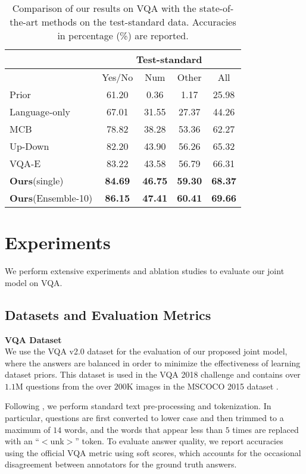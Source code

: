 \documentclass[11pt,a4paper]{article}
\begin{document}
\begin{table*}[!t]
\centering
\begin{tabular}{l|ccc|c}
\hline \toprule
                   & \multicolumn{4}{c}{Test-standard} \\\hline
                       & Yes/No  & Num   & Other  &All\\ \hline\hline
Prior \cite{goyal2017making} &61.20 & 0.36 &1.17 & 25.98 \\
Language-only \cite{goyal2017making} & 67.01 &31.55 & 27.37 & 44.26\\
MCB \cite{fukui2016multimodal} & 78.82 & 38.28 & 53.36 & 62.27 \\
Up-Down \cite{anderson2017bottom}   & 82.20    & 43.90  & 56.26 & 65.32   \\
VQA-E \cite{li2018vqa}   & 83.22 & 43.58 & 56.79 & 66.31   \\
\textbf{Ours}(single) & \textbf{84.69}   &  \textbf{46.75}  &    \textbf{59.30}     & \textbf{68.37}    \\\hline
\textbf{Ours}(Ensemble-10)  &\textbf{86.15}   &  \textbf{47.41} &  \textbf{60.41}   & \textbf{69.66}    \\\bottomrule
\end{tabular}
\caption{Comparison of our results on VQA with the state-of-the-art methods on the test-standard data. Accuracies in percentage (\%) are reported.}
\label{tab:vqa_compare}
\end{table*}
\section{Experiments}
We perform extensive experiments and ablation studies to evaluate our joint model on VQA. 

\subsection{Datasets and Evaluation Metrics}
\noindent\textbf{VQA Dataset}\\
We use the VQA v2.0 dataset \cite{antol2015vqa} for the evaluation of our proposed joint model, where the answers are balanced in order to minimize the effectiveness of learning dataset priors. This dataset is used in the VQA 2018 challenge and contains over $1.1$M questions from the over $200$K images in the MSCOCO 2015 dataset \cite{chen2015microsoft}.

Following , we perform standard text pre-processing and tokenization. In particular, questions are first converted to lower case and then trimmed to a maximum of $14$ words, and the words that appear less than $5$ times are replaced with an ``$<$unk$>$'' token. To evaluate answer quality, we report accuracies using the official VQA metric using soft scores, which accounts for the occasional disagreement between annotators for the ground truth answers.\\
\end{document}
